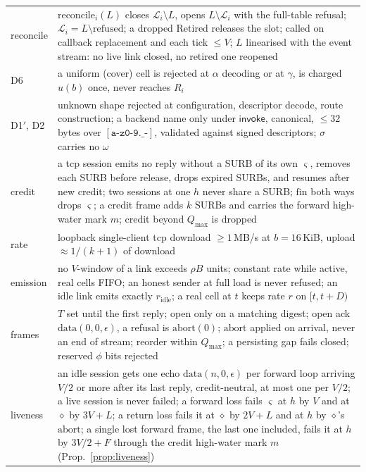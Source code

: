 \documentclass[journal]{IEEEtran}
\newcommand{\cl}{\diamond}
\newcommand{\sid}{\varsigma}
\DeclareRobustCommand{\code}[1]{{\ttfamily\renewcommand{\_}{\textunderscore\allowbreak}#1}}
\begin{document}
\begin{table}[t]
\begin{tabular}{@{}>{\raggedright\arraybackslash}p{}>{\raggedright\arraybackslash}p{}@{}}
reconcile & $\mathrm{reconcile}_i(L)$ closes $\mathcal L_i\setminus L$, opens $L\setminus\mathcal L_i$ with the full-table refusal; $\mathcal L_i=L\setminus\mathrm{refused}$; a dropped \code{Retired} releases the slot; called on callback replacement and each tick $\le V$; $L$ linearised with the event stream: no live link closed, no retired one reopened \\
D6 & a uniform (cover) cell is rejected at $\alpha$ decoding or at $\gamma$, is charged $u(b)$ once, never reaches $R_i$ \\
D1$'$, D2 & unknown shape rejected at configuration, descriptor decode, route construction; a backend name only under $\mathsf{invoke}$, canonical, $\le32$ bytes over $[\mathtt{a\text{-}z0\text{-}9.\_\text{-}}]$, validated against signed descriptors; $\sigma$ carries no $\omega$ \\
credit & a \code{tcp} session emits no reply without a SURB of its own $\sid$, removes each SURB before release, drops expired SURBs, and resumes after new credit; two sessions at one $h$ never share a SURB; $\mathrm{fin}$ both ways drops $\sid$; a credit frame adds $k$ SURBs and carries the forward high-water mark $m$; credit beyond $Q_{\max}$ is dropped \\
rate & loopback single-client \code{tcp} download $\ge1$\,MB/s at $b=16$\,KiB, upload $\approx1/(k+1)$ of download \\
emission & no $V$-window of a link exceeds $\rho B$ units; constant rate while active, real cells FIFO; an honest sender at full load is never refused; an idle link emits exactly $r_{\mathrm{idle}}$; a real cell at $t$ keeps rate $r$ on $[t,t+D)$ \\
frames & $T$ set until the first reply; open only on a matching digest; open ack $\mathrm{data}(0,0,\epsilon)$, a refusal is $\mathrm{abort}(0)$; $\mathrm{abort}$ applied on arrival, never an end of stream; reorder within $Q_{\max}$; a persisting gap fails closed; reserved $\phi$ bits rejected \\
liveness & an idle session gets one echo $\mathrm{data}(n,0,\epsilon)$ per forward loop arriving $V/2$ or more after its last reply, credit-neutral, at most one per $V/2$; a live session is never failed; a forward loss fails $\sid$ at $h$ by $V$ and at $\cl$ by $3V+L$; a return loss fails it at $\cl$ by $2V+L$ and at $h$ by $\cl$'s $\mathrm{abort}$; a single lost forward frame, the last one included, fails it at $h$ by $3V/2+F$ through the credit high-water mark $m$ (Prop.~\ref{prop:liveness}) \\

\end{tabular}
\end{table}
\end{document}
